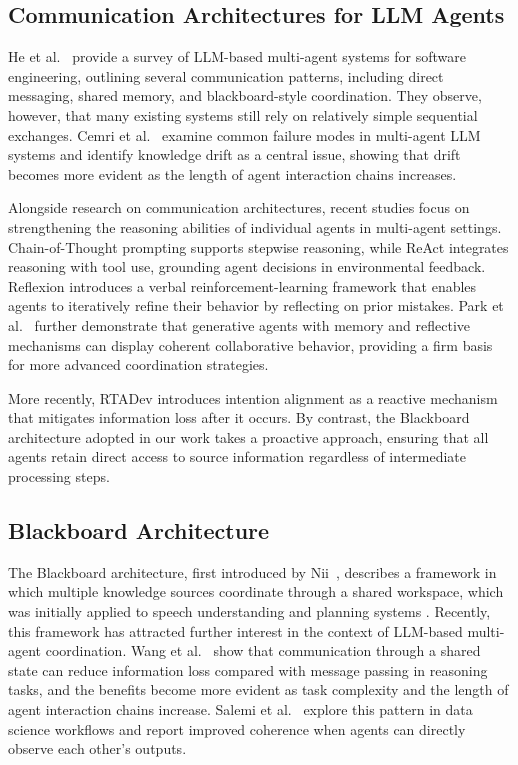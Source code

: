 \documentclass{ieeeaccess}
\begin{document}
\subsection{Communication Architectures for LLM Agents}

He et al.~\cite{he2025llm} provide a survey of LLM-based multi-agent systems for software engineering, outlining several communication patterns, including direct messaging, shared memory, and blackboard-style coordination. They observe, however, that many existing systems still rely on relatively simple sequential exchanges. Cemri et al.~\cite{cemri2025why} examine common failure modes in multi-agent LLM systems and identify knowledge drift as a central issue, showing that drift becomes more evident as the length of agent interaction chains increases.

Alongside research on communication architectures, recent studies focus on strengthening the reasoning abilities of individual agents in multi-agent settings. Chain-of-Thought prompting \cite{wei2022chain} supports stepwise reasoning, while ReAct \cite{yao2023react} integrates reasoning with tool use, grounding agent decisions in environmental feedback. Reflexion \cite{shinn2023reflexion} introduces a verbal reinforcement-learning framework that enables agents to iteratively refine their behavior by reflecting on prior mistakes. Park et al.~\cite{park2023generative} further demonstrate that generative agents with memory and reflective mechanisms can display coherent collaborative behavior, providing a firm basis for more advanced coordination strategies.

More recently, RTADev \cite{fang2025rtadev} introduces intention alignment as a reactive mechanism that mitigates information loss after it occurs. By contrast, the Blackboard architecture adopted in our work takes a proactive approach, ensuring that all agents retain direct access to source information regardless of intermediate processing steps.

\subsection{Blackboard Architecture}

The Blackboard architecture, first introduced by Nii~\cite{nii1986blackboard}, describes a framework in which multiple knowledge sources coordinate through a shared workspace, which was initially applied to speech understanding and planning systems \cite{erman1980hearsay}. Recently, this framework has attracted further interest in the context of LLM-based multi-agent coordination. Wang et al.~\cite{wang2025lbmas} show that communication through a shared state can reduce information loss compared with message passing in reasoning tasks, and the benefits become more evident as task complexity and the length of agent interaction chains increase. Salemi et al.~\cite{salemi2025llm} explore this pattern in data science workflows and report improved coherence when agents can directly observe each other's outputs.
\end{document}
